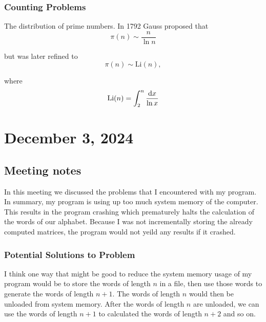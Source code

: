 \documentclass{amsart}
\begin{document}
\subsubsection{Counting Problems}

\begin{example*}
	The distribution of prime numbers. In 1792 Gauss proposed that
	\begin{equation*}
		\pi(n) \sim \frac{n}{\ln n}
	\end{equation*}
	
	but was later refined to 
	\begin{equation*}
		\pi(n) \sim \text{Li}(n),
	\end{equation*}
	
	where
	\begin{equation*}
		\text{Li}(n) = \int_{2}^{n} \frac{\mathop{}\!\mathrm{d} x}{\ln x}
	\end{equation*}\cite{wolfram_prime_num_theorem}
\end{example*}


\section{December 3, 2024}
\subsection{Meeting notes}

\begin{summary}
	In this meeting we discussed the problems that I encountered with my program. In summary, my program is using up too much system memory of the computer. This results in the program crashing which prematurely halts the calculation of the words of our alphabet. Because I was not incrementally storing the already computed matrices, the program would not yeild any results if it crashed. 
\end{summary}



\subsubsection*{Potential Solutions to Problem}
I think one way that might be good to reduce the system memory usage of my program would be to store the words of length $n$ in a file, then use those words to generate the words of length $n + 1$. The words of length $n$ would then be unloaded from system memory. After the words of length $n$ are unloaded, we can use the words of length $n + 1$ to calculated the words of length $n + 2$ and so on. 
\end{document}
